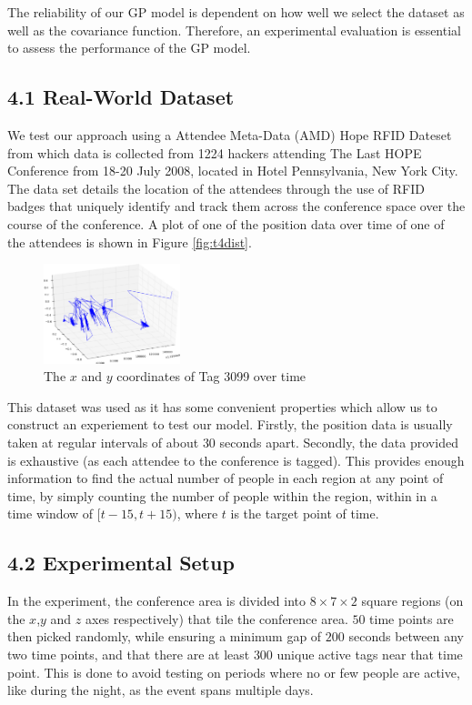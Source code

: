 \documentclass[letterpaper]{article}
\begin{document}
The reliability of our GP model is dependent on how well we select the dataset as well as the covariance function. Therefore, an experimental evaluation is essential to assess the performance of the GP model.

\subsection{4.1  Real-World Dataset}

We test our approach using a Attendee Meta-Data (AMD) Hope RFID Dateset from which data is collected from 1224 hackers attending The Last HOPE Conference from 18-20 July 2008, located in Hotel Pennsylvania, New York City. The data set details the location of the attendees through the use of RFID badges that uniquely identify and track them across the conference space over the course of the conference. A plot of one of the position data over time of one of the attendees is shown in Figure \ref{fig:t4dist}.\\

\begin{figure}[h!]
  \centering
    \includegraphics[width=150px,natwidth=675,natheight=493]{positiondata.png}
  \caption{The $x$ and $y$ coordinates of Tag 3099 over time}
  \label{fig:spaths}
\end{figure}

This dataset was used as it has some convenient properties which allow us to construct an experiement to test our model. Firstly, the position data is usually taken at regular intervals of about $30$ seconds apart. Secondly, the data provided is exhaustive (as each attendee to the conference is tagged). This provides enough information to find the actual number of people in each region at any point of time, by simply counting the number of people within the region, within in a time window of $[t-15,t+15)$, where $t$ is the target point of time. 

\subsection{4.2  Experimental Setup}

In the experiment, the conference area is divided into $8\times 7 \times 2$ square regions (on the $x$,$y$ and $z$ axes respectively) that tile the conference area. $50$ time points are then picked randomly, while ensuring a minimum gap of $200$ seconds between any two time points, and that there are at least $300$ unique active tags near that time point. This is done to avoid testing on periods where no or few people are active, like during the night, as the event spans multiple days.\\
\end{document}
